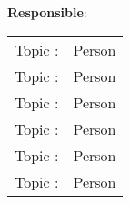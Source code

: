 \textbf{Responsible}: \\
\begin{tabular}{ll}
    Topic :& Person\\
    Topic :& Person\\
    Topic :& Person \\
    Topic :& Person \\
    Topic :& Person \\
    Topic :& Person
\end{tabular}